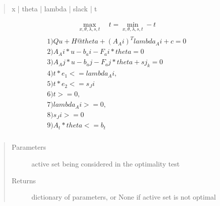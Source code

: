 \documentclass[letterpaper,10pt,english]{sphinxmanual}
\begin{document}
\begin{fulllineitems}
\begin{fulllineitems}
\begin{quote}
\sphinxAtStartPar
x | theta | lambda | slack | t
\end{quote}
\begin{equation*}
\begin{split}\max_{x, \theta, \lambda, s, t} \quad t = \min_{x, \theta, \lambda, s, t} -t\end{split}
\end{equation*}\begin{align*}\!\begin{aligned}
1) Qu + H@theta + (A_Ai)^T lambda_Ai + c = 0\\
2) A_Ai*u - b_ai-F_ai*theta = 0\\
3) A_Aj*u - b_aj-F_aj*theta + sj_k= 0\\
4) t*e_1 <= lambda_Ai,\\
5) t*e_2 <= s_Ji\\
6) t >= 0,\\
7) lambda_Ai>= 0,\\
8) s_Ji>=0\\
9) A_t*theta<= b_t\\
\end{aligned}\end{align*}\begin{quote}\begin{description}
\item[{Parameters}] \leavevmode
\sphinxAtStartPar
{} \textendash{} active set being considered in the optimality test

\item[{Returns}] \leavevmode
\sphinxAtStartPar
dictionary of parameters, or None if active set is not optimal

\end{description}\end{quote}

\end{fulllineitems}


\begin{fulllineitems}
\label{\detokenize{ppopt:ppopt.mpqp_program.MPQP_Program.equality_indices}}
\end{fulllineitems}


\end{fulllineitems}
\end{document}

